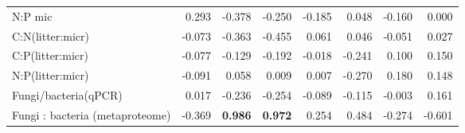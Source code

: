 \documentclass[10pt]{article}
\begin{document}
\begin{flushleft}
\begin{landscape}
\begin{table}[h!]
{\begin{tabular}{lrrrrrrr}
  N:P mic & 0.293 & -0.378 & -0.250 & -0.185 & 0.048 & -0.160 & 0.000 \\ 
  C:N(litter:micr) & -0.073 & -0.363 & -0.455 & 0.061 & 0.046 & -0.051 & 0.027 \\ 
  C:P(litter:micr) & -0.077 & -0.129 & -0.192 & -0.018 & -0.241 & 0.100 & 0.150 \\ 
  N:P(litter:micr) & -0.091 & 0.058 & 0.009 & 0.007 & -0.270 & 0.180 & 0.148 \\ 
  Fungi/bacteria(qPCR) & 0.017 & -0.236 & -0.254 & -0.089 & -0.115 & -0.003 & 0.161 \\ 
  Fungi : bacteria (metaproteome) & -0.369 & \textbf{ 0.986 } & \textbf{ 0.972 } & 0.254 & 0.484 & -0.274 & -0.601 \\ 
   \hline
\end{tabular}
}
\end{table}\end{landscape}




\end{flushleft}
\end{document}
